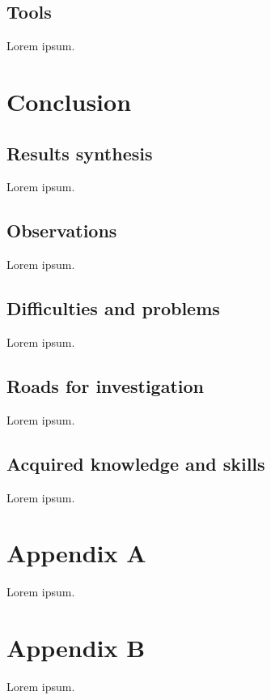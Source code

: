 \documentclass[12pt, a4paper]{report}
\begin{document}
		\section{Tools}
			Lorem ipsum.

	\chapter{Conclusion}
		\section{Results synthesis}
			Lorem ipsum.
		
		\section{Observations}
			Lorem ipsum.
		
		\section{Difficulties and problems}
			Lorem ipsum.
		
		\section{Roads for investigation}
			Lorem ipsum.
		
		\section{Acquired knowledge and skills}
			Lorem ipsum.
	
	
	
	
	\appendix
	\chapter{Appendix A}
		Lorem ipsum.

	\chapter{Appendix B}
		Lorem ipsum.

	\makeutbmbackcover{}
\end{document}
